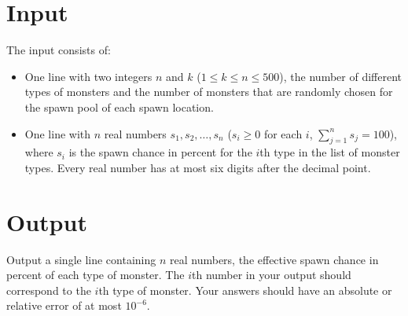 \section*{Input}
The input consists of:
\begin{itemize}
  \item One line with two integers $n$ and $k$ ($1 \le k \le n \le 500$), the number of different types of monsters and the number of monsters that are randomly chosen
    for the spawn pool of each spawn location.
  \item One line with $n$ real numbers $s_1, s_2, \ldots, s_n$ ($s_i \ge 0$ for each $i$, $\sum^{n}_{j=1}s_j = 100$), where $s_i$ is the spawn chance in percent for the $i$th type in the list of monster types.  Every real number has at most six digits after the decimal point.
\end{itemize}

\section*{Output}
Output a single line containing $n$ real numbers, the effective spawn chance in percent of each type of monster. The $i$th number in your output should correspond to the $i$th type of monster.
Your answers should have an absolute or relative error of at most $10^{-6}$.
